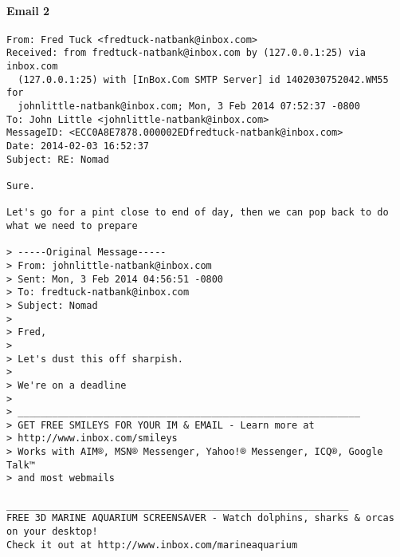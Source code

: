 \paragraph{Email 2}
\label{MailNomad2}
\begin{verbatim}
From: Fred Tuck <fredtuck-natbank@inbox.com>
Received: from fredtuck-natbank@inbox.com by (127.0.0.1:25) via inbox.com
  (127.0.0.1:25) with [InBox.Com SMTP Server] id 1402030752042.WM55 for
  johnlittle-natbank@inbox.com; Mon, 3 Feb 2014 07:52:37 -0800
To: John Little <johnlittle-natbank@inbox.com>
MessageID: <ECC0A8E7878.000002EDfredtuck-natbank@inbox.com>
Date: 2014-02-03 16:52:37
Subject: RE: Nomad

Sure. 

Let's go for a pint close to end of day, then we can pop back to do what we need to prepare

> -----Original Message-----
> From: johnlittle-natbank@inbox.com
> Sent: Mon, 3 Feb 2014 04:56:51 -0800
> To: fredtuck-natbank@inbox.com
> Subject: Nomad
> 
> Fred,
> 
> Let's dust this off sharpish.
> 
> We're on a deadline
> 
> ____________________________________________________________
> GET FREE SMILEYS FOR YOUR IM & EMAIL - Learn more at
> http://www.inbox.com/smileys
> Works with AIM®, MSN® Messenger, Yahoo!® Messenger, ICQ®, Google Talk™
> and most webmails

____________________________________________________________
FREE 3D MARINE AQUARIUM SCREENSAVER - Watch dolphins, sharks & orcas on your desktop!
Check it out at http://www.inbox.com/marineaquarium


\end{verbatim}

